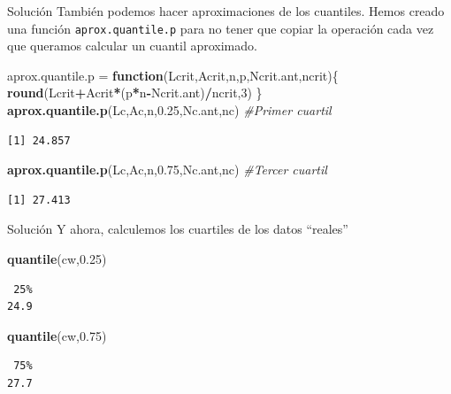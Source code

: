 \documentclass[
  ignorenonframetext,
  aspectratio=169]{beamer}
\newenvironment{Shaded}{\begin{snugshade}}{\end{snugshade}}
\newcommand{\CommentTok}[1]{\textcolor[rgb]{0.56,0.35,0.01}{\textit{#1}}}
\newcommand{\ControlFlowTok}[1]{\textcolor[rgb]{0.13,0.29,0.53}{\textbf{#1}}}
\newcommand{\DecValTok}[1]{\textcolor[rgb]{0.00,0.00,0.81}{#1}}
\newcommand{\FloatTok}[1]{\textcolor[rgb]{0.00,0.00,0.81}{#1}}
\newcommand{\FunctionTok}[1]{\textcolor[rgb]{0.13,0.29,0.53}{\textbf{#1}}}
\newcommand{\NormalTok}[1]{#1}
\newcommand{\OtherTok}[1]{\textcolor[rgb]{0.56,0.35,0.01}{#1}}
\newcommand{\SpecialCharTok}[1]{\textcolor[rgb]{0.81,0.36,0.00}{\textbf{#1}}}
\begin{document}
\begin{frame}[fragile]{Solución}
\label{soluciuxf3n-35}
También podemos hacer aproximaciones de los cuantiles. Hemos creado una
función \texttt{aprox.quantile.p} para no tener que copiar la operación
cada vez que queramos calcular un cuantil aproximado.

\begin{Shaded}
\begin{Highlighting}[]
\NormalTok{aprox.quantile.p }\OtherTok{=} \ControlFlowTok{function}\NormalTok{(Lcrit,Acrit,n,p,Ncrit.ant,ncrit)\{}
  \FunctionTok{round}\NormalTok{(Lcrit}\SpecialCharTok{+}\NormalTok{Acrit}\SpecialCharTok{*}\NormalTok{(p}\SpecialCharTok{*}\NormalTok{n}\SpecialCharTok{{-}}\NormalTok{Ncrit.ant)}\SpecialCharTok{/}\NormalTok{ncrit,}\DecValTok{3}\NormalTok{)}
\NormalTok{\}}
\FunctionTok{aprox.quantile.p}\NormalTok{(Lc,Ac,n,}\FloatTok{0.25}\NormalTok{,Nc.ant,nc) }\CommentTok{\#Primer cuartil}
\end{Highlighting}
\end{Shaded}

\begin{verbatim}
[1] 24.857
\end{verbatim}

\begin{Shaded}
\begin{Highlighting}[]
\FunctionTok{aprox.quantile.p}\NormalTok{(Lc,Ac,n,}\FloatTok{0.75}\NormalTok{,Nc.ant,nc) }\CommentTok{\#Tercer cuartil}
\end{Highlighting}
\end{Shaded}

\begin{verbatim}
[1] 27.413
\end{verbatim}
\end{frame}

\begin{frame}[fragile]{Solución}
\label{soluciuxf3n-36}
Y ahora, calculemos los cuartiles de los datos ``reales''

\begin{Shaded}
\begin{Highlighting}[]
\FunctionTok{quantile}\NormalTok{(cw,}\FloatTok{0.25}\NormalTok{)}
\end{Highlighting}
\end{Shaded}

\begin{verbatim}
 25% 
24.9 
\end{verbatim}

\begin{Shaded}
\begin{Highlighting}[]
\FunctionTok{quantile}\NormalTok{(cw,}\FloatTok{0.75}\NormalTok{)}
\end{Highlighting}
\end{Shaded}

\begin{verbatim}
 75% 
27.7 
\end{verbatim}
\end{frame}
\end{document}
